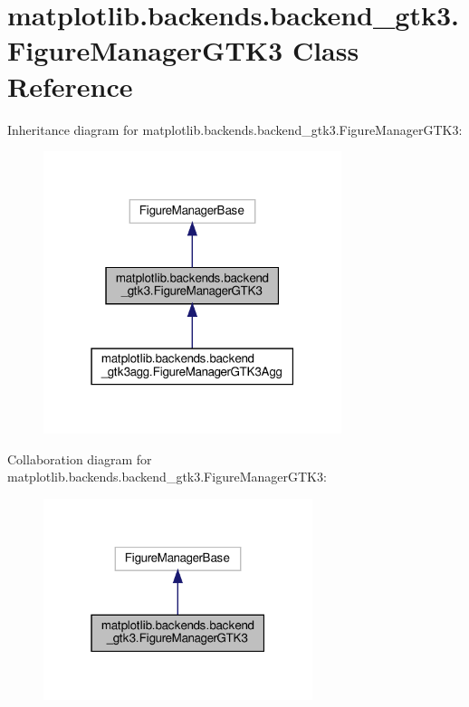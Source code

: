 \hypertarget{classmatplotlib_1_1backends_1_1backend__gtk3_1_1FigureManagerGTK3}{}\section{matplotlib.\+backends.\+backend\+\_\+gtk3.\+Figure\+Manager\+G\+T\+K3 Class Reference}
\label{classmatplotlib_1_1backends_1_1backend__gtk3_1_1FigureManagerGTK3}


Inheritance diagram for matplotlib.\+backends.\+backend\+\_\+gtk3.\+Figure\+Manager\+G\+T\+K3\+:
\nopagebreak
\begin{figure}[H]
\begin{center}
\leavevmode
\includegraphics[width=247pt]{classmatplotlib_1_1backends_1_1backend__gtk3_1_1FigureManagerGTK3__inherit__graph}
\end{center}
\end{figure}


Collaboration diagram for matplotlib.\+backends.\+backend\+\_\+gtk3.\+Figure\+Manager\+G\+T\+K3\+:
\nopagebreak
\begin{figure}[H]
\begin{center}
\leavevmode
\includegraphics[width=223pt]{classmatplotlib_1_1backends_1_1backend__gtk3_1_1FigureManagerGTK3__coll__graph}
\end{center}
\end{figure}
